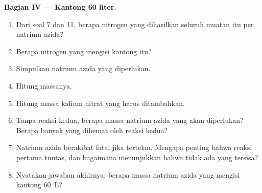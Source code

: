 \begin{problem}
\medskip
\noindent\textbf{Bagian IV --- Kantong 60 liter.}
\begin{enumerate}[resume]
  \item Dari soal 7 dan 11, berapa  nitrogen yang dihasilkan
        seluruh muatan itu per  natrium azida?
  \item Berapa  nitrogen yang mengisi kantong itu?
  \item Simpulkan  natrium azida yang diperlukan.
  \item Hitung massanya.
  \item Hitung massa kalium nitrat yang harus ditambahkan.
  \item Tanpa reaksi kedua, berapa massa natrium azida yang akan
        diperlukan? Berapa banyak yang dihemat oleh reaksi kedua?
  \item Natrium azida berakibat fatal jika tertelan. Mengapa penting
        bahwa reaksi pertama tuntas, dan bagaimana 
        menunjukkan bahwa tidak ada yang tersisa?
  \item Nyatakan jawaban akhirnya: berapa massa natrium azida yang
        mengisi kantong  \qty{60}{L}?
\end{enumerate}
\end{problem}
